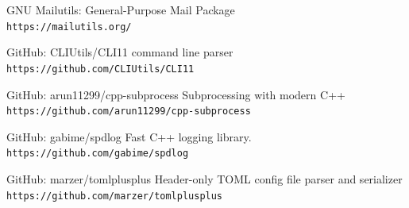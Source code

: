\documentclass[12pt]{article}
\begin{document}
\begin{thebibliography}{25}
GNU Mailutils: General-Purpose Mail Package
\\\texttt{https://mailutils.org/}

GitHub: CLIUtils/CLI11 command line parser
\\\texttt{https://github.com/CLIUtils/CLI11}

GitHub:  arun11299/cpp-subprocess Subprocessing with modern C++ 
\\\texttt{https://github.com/arun11299/cpp-subprocess}

GitHub:  gabime/spdlog Fast C++ logging library. 
\\\texttt{https://github.com/gabime/spdlog}

GitHub:  marzer/tomlplusplus Header-only TOML config file parser and serializer
\\\texttt{https://github.com/marzer/tomlplusplus}

\end{thebibliography}
\end{document}
